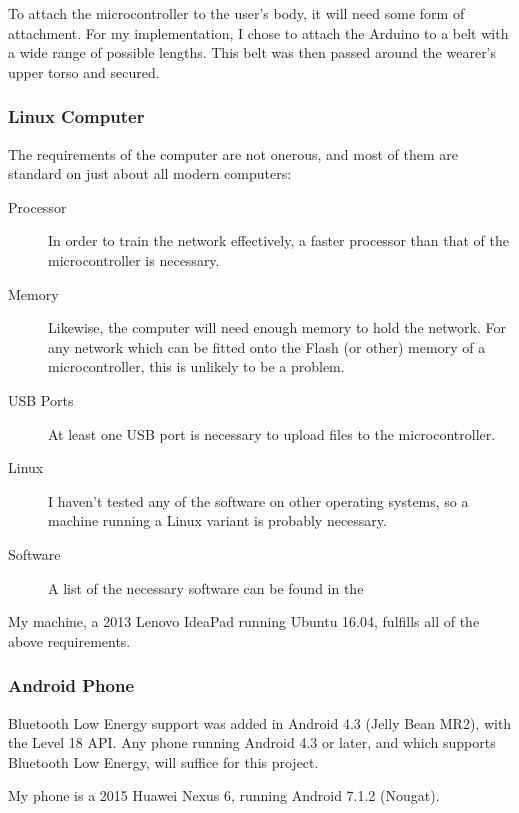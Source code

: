 \documentclass[a4paper]{article}
\begin{document}
To attach the microcontroller to the user's body, it will need some form of attachment. For my implementation, I chose to attach the Arduino to a belt with a wide range of possible lengths. This belt was then passed around the wearer's upper torso and secured. 



\subsubsection{Linux Computer}

The requirements of the computer are not onerous, and most of them are standard on just about all modern computers:

\begin{description}
\item[Processor] In order to train the network effectively, a faster processor than that of the microcontroller is necessary. 
\item[Memory] Likewise, the computer will need enough memory to hold the network. For any network which can be fitted onto the Flash (or other) memory of a microcontroller, this is unlikely to be a problem.
\item[USB Ports] At least one USB port is necessary to upload files to the microcontroller.
\item[Linux] I haven't tested any of the software on other operating systems, so a machine running a Linux variant is probably necessary.
\item[Software] A list of the necessary software can be found in the 
\end{description}

My machine, a 2013 Lenovo IdeaPad running Ubuntu 16.04, fulfills all of the above requirements.


\subsubsection{Android Phone}

Bluetooth Low Energy support was added in Android 4.3 (Jelly Bean MR2), with the Level 18 API.\cite{dsref5} Any phone running Android 4.3 or later, and which supports Bluetooth Low Energy, will suffice for this project.

My phone is a 2015 Huawei Nexus 6, running Android 7.1.2 (Nougat).
\end{document}
